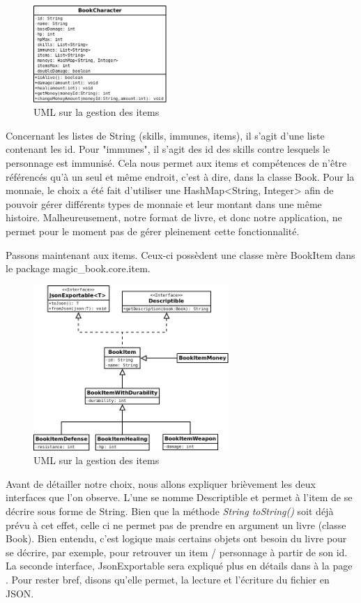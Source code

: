 			\begin{figure}[H]
				\centering\includegraphics[width=0.45\textwidth, keepaspectratio]{img/book_character.png}
				\caption{UML sur la gestion des items}
			\end{figure}

			Concernant les listes de String (skills, immunes, items), il s'agit d'une liste contenant les id. Pour "immunes", il s'agit des id des skills contre lesquels le personnage est immunisé. Cela nous permet aux items et compétences de n'être référencés qu'à un seul et même endroit, c'est à dire, dans la classe Book. Pour la monnaie, le choix a été fait d'utiliser une HashMap<String, Integer> afin de pouvoir gérer différents types de monnaie et leur montant dans une même histoire. Malheureusement, notre format de livre, et donc notre application, ne permet pour le moment pas de gérer pleinement cette fonctionnalité.

			Passons maintenant aux items. Ceux-ci possèdent une classe mère BookItem dans le package magic\_book.core.item.

			\begin{figure}[H]
				\centering\includegraphics[width=0.66\textwidth, keepaspectratio]{img/book_item.png}
				\caption{UML sur la gestion des items}
			\end{figure}

			Avant de détailler notre choix, nous allons expliquer brièvement les deux interfaces que l'on observe. L'une se nomme Descriptible et permet à l'item de se décrire sous forme de String. Bien que la méthode \textit{String toString()} soit déjà prévu à cet effet, celle ci ne permet pas de prendre en argument un livre (classe Book). Bien entendu, c'est logique mais certains objets ont besoin du livre pour se décrire, par exemple, pour retrouver un item / personnage à partir de son id. La seconde interface, JsonExportable sera expliqué plus en détails dans  à la page \pageref{subsec:lecture_ecriture_fichier}. Pour rester bref, disons qu'elle permet, la lecture et l'écriture du fichier en JSON.

